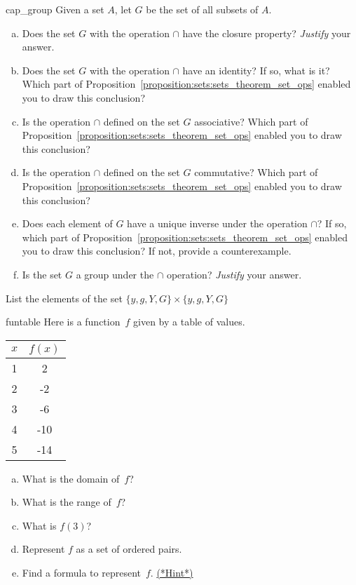 \begin{exercise}{cap_group}
Given a set $A$, let $G$ be the set of all subsets of $A$. 
\begin{enumerate}[(a)]
\item
Does the set $G$  with the operation $\cap$ have the closure property? \emph{Justify} your answer.
\item
Does the set $G$  with the operation $\cap$ have an identity? If so, what is it? Which part of  Proposition~\ref{proposition:sets:sets_theorem_set_ops} enabled you to draw this conclusion?
\item
Is the operation $\cap$ defined on the set $G$ associative? Which part of  Proposition~\ref{proposition:sets:sets_theorem_set_ops} enabled you to draw this conclusion?
\item
Is the operation $\cap$ defined on the set $G$ commutative? Which part of  Proposition~\ref{proposition:sets:sets_theorem_set_ops} enabled you to draw this conclusion?
\item
Does each element of $G$ have a unique inverse under the operation $\cap$? If so, which part of  Proposition~\ref{proposition:sets:sets_theorem_set_ops} enabled you to draw this conclusion? If not, provide a counterexample.
\item
Is the set $G$ a group under the $\cap$ operation?  \emph{Justify} your answer.
\end{enumerate}
\end{exercise} 

\begin{exercise}{}
List the elements of the set
$\{y,g,Y,G\} \times \{y,g,Y,G\}$
\end{exercise}

\begin{exercise}{funtable}
Here is a function~$f$ given by a table of values.

\begin{center}
\begin{tabular}{c|c}
$x$ & $f(x)$ \\ \hline

1 & 2 \\
2 & -2 \\
3 & -6 \\
4 & -10 \\
5 & -14 \\
\end{tabular}
\end{center}

\begin{enumerate}[(a)]
\item  \label{FunctionByTableEx-domain}
What is the domain of~$f$?
\item \label{FunctionByTableEx-range}
What is the range of~$f$? 
\item  \label{FunctionByTableEx-f(3)}
What is $f(3)$?
\item  \label{FunctionByTableEx-pairs}
Represent $f$ as a set of ordered pairs.
\item  \label{FunctionByTableEx-formula}
Find a formula to represent~$f$.
\hyperref[sec:functions:hints]{(*Hint*)}
\end{enumerate}
\end{exercise}


